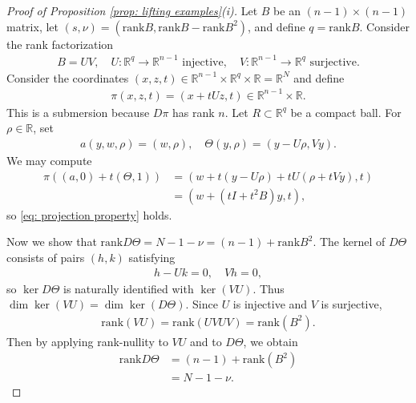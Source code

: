 \documentclass[reqno,11pt]{amsart}
\numberwithin{equation}{section}
\numberwithin{figure}{section}
\def\R{\mathbb{R}}
\theoremstyle{plain}
\theoremstyle{definition}
\newcommand{\rank}{\mathrm{rank}}
\begin{document}
    \begin{proof}[Proof of Proposition \ref{prop: lifting examples}(i)]
        Let $B$ be an $(n-1)\times (n-1)$ matrix, let $(s,\nu) = (\rank B, \rank B - \rank B^2)$, and define $q = \rank B$. Consider the rank factorization 
        \begin{align}
            B = UV, \quad U : \R^q \to \R^{n-1} \text{ injective}, \quad V : \R^{n-1} \to \R^q\text{ surjective.}
         \end{align}
         Consider the coordinates $(x,z,t) \in \R^{n-1} \times \R^q \times \R = \R^{N}$ and define 
         \begin{align}
             \pi(x,z,t) = (x + tUz,t) \in \R^{n-1} \times \R.
         \end{align}
         This is a submersion because $D\pi$ has rank $n$. Let $R \subset \R^q$ be a compact ball. For $\rho \in \R$, set 
         \begin{align}
             a(y,w,\rho) = (w,\rho), \quad \Theta(y,\rho) = (y- U\rho,Vy).
         \end{align}
         We may compute 
         \begin{align}
             \pi((a,0) + t(\Theta,1)) &= (w + t(y-U\rho) + tU(\rho + tVy),t) \\
             &= (w + (tI +t^2B)y,t),
         \end{align}
         so \eqref{eq: projection property} holds.

         Now we show that $\rank D\Theta = N - 1 - \nu = (n-1) + \rank B^2$. The kernel of $D \Theta$ consists of pairs $(h,k)$ satisfying
         \begin{align}
            h - Uk = 0, \quad Vh=0,
         \end{align}
         so $\ker D\Theta$ is naturally identified with $\ker(VU)$. Thus $\dim\ker (VU) = \dim \ker(D\Theta)$.
         Since $U$ is injective and $V$ is surjective, 
         \begin{align}
             \rank(VU) = \rank(UVUV) = \rank(B^2).
         \end{align}
         Then by applying rank-nullity to $VU$ and to $D\Theta$, we obtain 
         \begin{align}
             \rank D\Theta &= (n-1) + \rank(B^2) \\
             &= N-1-\nu.
         \end{align}
    \end{proof}
\end{document}

